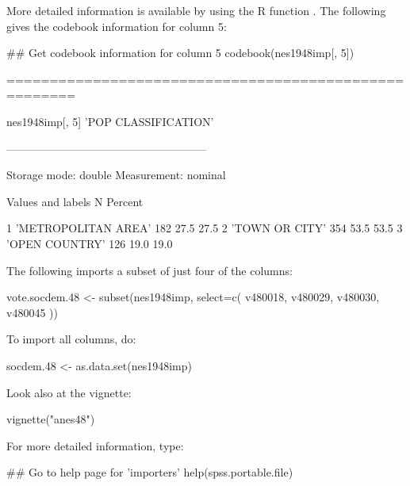 More detailed information is available by using the R function
.
The following gives the codebook information for  column 5:
\begin{Schunk}
\begin{Sinput}
## Get codebook information for column 5
codebook(nes1948imp[, 5])
\end{Sinput}
\begin{Soutput}
======================================================

   nes1948imp[, 5] 'POP CLASSIFICATION'

------------------------------------------------------

   Storage mode: double
   Measurement: nominal

         Values and labels    N    Percent 
                                           
   1   'METROPOLITAN AREA'  182   27.5 27.5
   2   'TOWN OR CITY'       354   53.5 53.5
   3   'OPEN COUNTRY'       126   19.0 19.0
\end{Soutput}
\end{Schunk}

The following imports a subset of just four of the columns:
\begin{Schunk}
\begin{Sinput}
vote.socdem.48 <- subset(nes1948imp,
              select=c(
                  v480018,
                  v480029,
                  v480030,
                  v480045
                  ))
\end{Sinput}
\end{Schunk}

To import all columns, do:
\begin{Schunk}
\begin{Sinput}
socdem.48 <- as.data.set(nes1948imp)
\end{Sinput}
\end{Schunk}

\begin{marginfigure}[24pt]
Look also at the vignette:\\[-3pt]
\begin{Schunk}
\begin{Sinput}
vignette("anes48")
\end{Sinput}
\end{Schunk}
\end{marginfigure}
For more detailed information, type:
\begin{Schunk}
\begin{Sinput}
## Go to help page for 'importers'
help(spss.portable.file)
\end{Sinput}
\end{Schunk}

